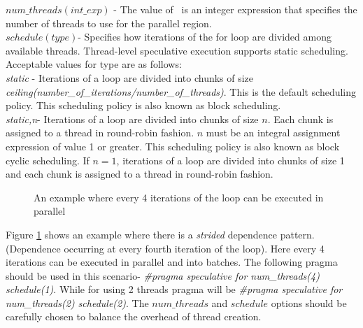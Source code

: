 \documentclass[10pt]{report}          %
\begin{document}
$num\_threads (int\_exp)$ - The value of \ is an integer expression that specifies the number of threads to use for the parallel region.\\
$schedule (type)$- Specifies how iterations of the for loop are divided among available threads. Thread-level speculative execution supports static scheduling. Acceptable
values for type are as follows:\\
\textit{static} - Iterations of a loop are divided into chunks of size\\
\textit{ceiling(number\_of\_iterations/number\_of\_threads)}. This is the default scheduling policy. This scheduling policy is also known as block scheduling.\\
\textit{static,n}- Iterations of a loop are divided into chunks of size $n$. Each chunk is assigned to a thread in round-robin fashion. $n$ must be an integral assignment expression of value 1 or greater. This scheduling policy is also known as block cyclic scheduling. If $n=1$, iterations of a loop are divided into chunks of size 1 and each chunk is assigned to a thread in round-robin fashion. \\

\begin{figure}[h]
\begin{center}
\caption{An example where every 4 iterations of the loop can be executed in parallel}
\end{center}
\label{fig:indep_window}
\end{figure}

Figure \ref{fig:indep_window} shows an example where there is a \textit{strided} dependence pattern. (Dependence occurring at every fourth iteration of the loop).  Here every 4 iterations can be executed in parallel and into batches. The following pragma should be used in this scenario- \textit{\#pragma speculative for num\_threads(4) schedule(1)}.  While for using 2 threads pragma will be \textit{\#pragma speculative for num\_threads(2) schedule(2)}.  The $num\_threads$ and $schedule$ options should be carefully chosen to balance the overhead of thread creation.
\end{document}
